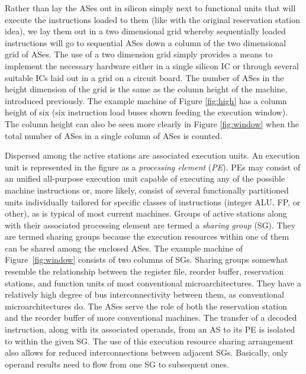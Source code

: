 \documentclass[10pt,dvips]{article}
\begin{document}
Rather than lay the ASes out in silicon simply next to
functional units that will execute the instructions loaded to them
(like with the original reservation station idea),
we lay them out in a two dimensional grid whereby sequentially
loaded instructions will go to sequential ASes down a column of
the two dimensional grid of ASes.  
The use of a two dimension
grid simply provides a means to implement the necessary
hardware either in a single silicon IC or through several
suitable ICs laid out in a grid on a circuit board.
The number of ASes in the height dimension of the grid is the
same as the column height of the machine, introduced previously.
The example machine of Figure \ref{fig:high} has a column height of
six (six instruction load buses shown feeding the execution window). 
The column height can also be seen more clearly in 
Figure \ref{fig:window} when the total
number of ASes in a single column of ASes is counted.

Dispersed among the active stations are associated execution
units.  An execution unit is represented in the figure as
a \textit{processing element} (\textit{PE}).  
PEs may consist of an unified all-purpose execution unit capable of
executing any of the possible machine instructions or, more likely,
consist of
several functionally partitioned units individually tailored
for specific classes of instructions (integer ALU, FP, or other),
as is typical of most current machines.
Groups of active stations along with their associated processing
element are termed a \textit{sharing group} (SG).  
They are termed sharing groups because the execution
resources within one of them can be shared among the enclosed ASes.
The example machine of Figure~\ref{fig:window}
consists of two columns of SGs.  
Sharing groups somewhat resemble
the relationship between the register file, reorder buffer,
reservation stations, and function units of most conventional
microarchitectures.  They have a relatively high degree of bus
interconnectivity between them, as conventional microarchitectures do.
The ASes serve the role of both the
reservation station and the reorder buffer of more conventional
machines.
The transfer of a decoded instruction, along with its associated operands,
from an AS to its PE is isolated to within the given SG.
The use of this execution resource sharing arrangement also allows
for reduced interconnections between adjacent SGs.
Basically, only operand results need to flow from one SG
to subsequent ones.
\end{document}
